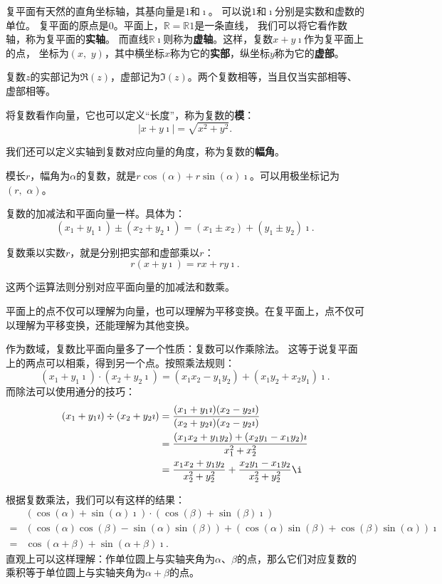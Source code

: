 \documentclass[12pt,UTF8]{ctexbook}
\theoremstyle{definition}
\theoremstyle{plain}
\begin{document}
复平面有天然的直角坐标轴，其基向量是$1$和$\imath$。
可以说$1$和$\imath$分别是实数和虚数的单位。
复平面的原点是$0$。平面上，$\mathbb{R} = \mathbb{R}1$是一条直线，
我们可以将它看作数轴，称为复平面的\textbf{实轴}。
而直线$\mathbb{R}\imath$则称为\textbf{虚轴}。这样，复数$x+y\imath$作为复平面上的点，
坐标为$(x,\,\,y)$，其中横坐标$x$称为它的\textbf{实部}，纵坐标$y$称为它的\textbf{虚部}。

复数$z$的实部记为$\Re(z)$，虚部记为$\Im(z)$。两个复数相等，当且仅当实部相等、虚部相等。

将复数看作向量，它也可以定义“长度”，称为复数的\textbf{模}：
$$ |x + y\imath| = \sqrt{x^2 + y^2}.$$

我们还可以定义实轴到复数对应向量的角度，称为复数的\textbf{幅角}。

模长$r$，幅角为$\alpha$的复数，就是$r\cos{(\alpha)} + r\sin{(\alpha)}\imath$。可以用极坐标记为$(r,\,\,\alpha)$。

复数的加减法和平面向量一样。具体为：
$$ (x_1 + y_1\imath) \pm (x_2 + y_2\imath) = (x_1 \pm x_2) + (y_1 \pm y_2)\imath. $$

复数乘以实数$r$，就是分别把实部和虚部乘以$r$：
$$ r(x + y\imath) = rx + ry\imath. $$

这两个运算法则分别对应平面向量的加减法和数乘。

平面上的点不仅可以理解为向量，也可以理解为平移变换。在复平面上，点不仅可以理解为平移变换，还能理解为其他变换。

作为数域，复数比平面向量多了一个性质：复数可以作乘除法。
这等于说复平面上的两点可以相乘，得到另一个点。按照乘法规则：
$$ (x_1 + y_1\imath) \cdot (x_2 + y_2\imath) = (x_1x_2 - y_1y_2) + (x_1y_2 + x_2y_1)\imath. $$
而除法可以使用通分的技巧：
\begin{align*}
    (x_1 + y_1\imath) \div (x_2 + y_2\imath) &= \frac{(x_1 + y_1\imath)(x_2 - y_2\imath)}{(x_2 + y_2\imath)(x_2 - y_2\imath)} \\
    &= \frac{(x_1x_2 + y_1y_2) + (x_2y_1 - x_1y_2)\imath}{x_1^2 + x_2^2} \\
    &= \frac{x_1x_2 + y_1y_2}{x_2^2 + y_2^2} + \frac{x_2y_1 - x_1y_2}{x_2^2 + y_2^2}\i
\end{align*}

根据复数乘法，我们可以有这样的结果：
\begin{align*}
     & (\cos{(\alpha)} + \sin{(\alpha)}\imath) \cdot (\cos{(\beta)} + \sin{(\beta)}\imath) \\
    =& (\cos{(\alpha)}\cos{(\beta)} - \sin{(\alpha)}\sin{(\beta)}) + (\cos{(\alpha)}\sin{(\beta)} + \cos{(\beta)}\sin{(\alpha)})\imath \\
    =& \cos{(\alpha + \beta)} + \sin{(\alpha + \beta)}\imath.
\end{align*}
直观上可以这样理解：作单位圆上与实轴夹角为$\alpha$、$\beta$的点，那么它们对应复数的乘积等于单位圆上与实轴夹角为$\alpha+\beta$的点。
\end{document}
